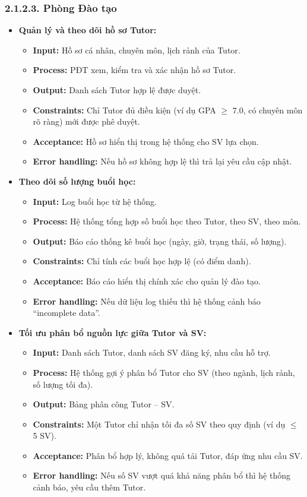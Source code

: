 \subsubsection*{2.1.2.3. Phòng Đào tạo}
\begin{itemize}
    \item \textbf{Quản lý và theo dõi hồ sơ Tutor:}
    \begin{itemize}
        \item \textbf{Input:} Hồ sơ cá nhân, chuyên môn, lịch rảnh của Tutor.
        \item \textbf{Process:} PĐT xem, kiểm tra và xác nhận hồ sơ Tutor.
        \item \textbf{Output:} Danh sách Tutor hợp lệ được duyệt.
        \item \textbf{Constraints:} Chỉ Tutor đủ điều kiện (ví dụ GPA $\geq$ 7.0, có chuyên môn rõ ràng) mới được phê duyệt.
        \item \textbf{Acceptance:} Hồ sơ hiển thị trong hệ thống cho SV lựa chọn.
        \item \textbf{Error handling:} Nếu hồ sơ không hợp lệ thì trả lại yêu cầu cập nhật.
    \end{itemize}

    \item \textbf{Theo dõi số lượng buổi học:}
    \begin{itemize}
        \item \textbf{Input:} Log buổi học từ hệ thống.
        \item \textbf{Process:} Hệ thống tổng hợp số buổi học theo Tutor, theo SV, theo môn.
        \item \textbf{Output:} Báo cáo thống kê buổi học (ngày, giờ, trạng thái, số lượng).
        \item \textbf{Constraints:} Chỉ tính các buổi học hợp lệ (có điểm danh).
        \item \textbf{Acceptance:} Báo cáo hiển thị chính xác cho quản lý đào tạo.
        \item \textbf{Error handling:} Nếu dữ liệu log thiếu thì hệ thống cảnh báo “incomplete data”.
    \end{itemize}

    \item \textbf{Tối ưu phân bổ nguồn lực giữa Tutor và SV:}
    \begin{itemize}
        \item \textbf{Input:} Danh sách Tutor, danh sách SV đăng ký, nhu cầu hỗ trợ.
        \item \textbf{Process:} Hệ thống gợi ý phân bổ Tutor cho SV (theo ngành, lịch rảnh, số lượng tối đa).
        \item \textbf{Output:} Bảng phân công Tutor – SV.
        \item \textbf{Constraints:} Một Tutor chỉ nhận tối đa số SV theo quy định (ví dụ $\leq$ 5 SV).
        \item \textbf{Acceptance:} Phân bổ hợp lý, không quá tải Tutor, đáp ứng nhu cầu SV.
        \item \textbf{Error handling:} Nếu số SV vượt quá khả năng phân bổ thì hệ thống cảnh báo, yêu cầu thêm Tutor.
    \end{itemize}
\end{itemize}


